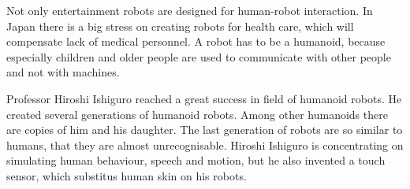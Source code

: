   Not only entertainment robots are designed for human-robot interaction. In Japan there is a big stress 
  on creating	robots for health care, which will compensate lack of medical personnel. 
  A robot has to be a humanoid, because especially children and older people are used to 
  communicate with other people and not with machines.
  
  Professor Hiroshi Ishiguro reached a great success in field of humanoid robots. 
  He created several generations of humanoid robots.
  Among other humanoids there are copies of him and his daughter.
  The last generation of robots are so similar to humans, that they are almost unrecognisable.
  Hiroshi Ishiguro is concentrating on simulating human behaviour, speech and motion, 
  but he also invented a touch sensor, which substitus human skin on his robots.

